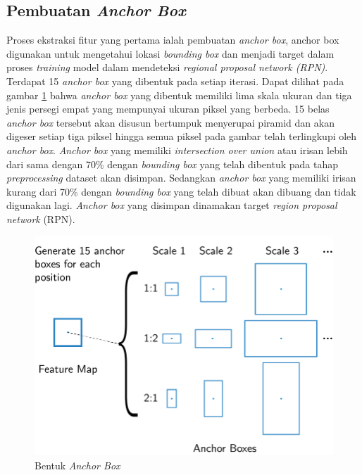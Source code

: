 \subsection{Pembuatan \textit{Anchor Box}}
Proses ekstraksi fitur yang pertama ialah pembuatan \textit{anchor box}, anchor box digunakan untuk mengetahui
lokasi \textit{bounding box} dan menjadi target dalam proses \textit{training} model dalam mendeteksi
\textit{regional proposal network (RPN)}. Terdapat 15 \textit{anchor box} yang dibentuk pada setiap iterasi.
Dapat dilihat pada gambar \ref{fig: Bentuk_Anchor_Box} bahwa \textit{anchor box} yang dibentuk memiliki lima
skala ukuran dan tiga jenis persegi empat yang mempunyai ukuran piksel yang berbeda. 15 belas \textit{anchor box}
tersebut akan disusun bertumpuk menyerupai piramid dan akan digeser setiap tiga piksel hingga semua piksel pada 
gambar telah terlingkupi oleh \textit{anchor box}. \textit{Anchor box} yang memiliki \textit{intersection over union}
atau irisan lebih dari sama dengan 70\% dengan \textit{bounding box} yang telah dibentuk pada tahap \textit{preprocessing}
dataset akan disimpan. Sedangkan \textit{anchor box} yang memiliki irisan kurang dari 70\% dengan \textit{bounding
box} yang telah dibuat akan dibuang dan tidak digunakan lagi. \textit{Anchor box} yang disimpan dinamakan 
target \textit{region proposal network} (RPN).

\begin{figure}[h!]
  \begin{center}
    \includegraphics[width= 0.7\linewidth]{bab3/Anchor-Boxes-at-a-certain-position-in-the-feature-map.png}
    \caption{Bentuk \textit{Anchor Box} \cite{article_Anchor_Box}}
    \label{fig: Bentuk_Anchor_Box}
  \end{center}
\end{figure}

